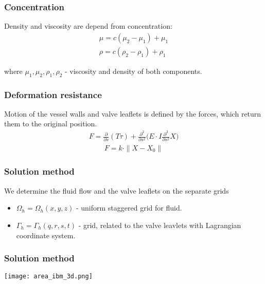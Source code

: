 \documentclass[14pt]{beamer}
\begin{document}
\begin{frame}
\frametitle{Concentration}
Density and viscosity are depend from concentration:
\begin{gather}
    \label{eq:concentration_viscosity}
    \mu = c (\mu_2 - \mu_1) + \mu_1\\
    \label{eq:concentration_density}
    \rho = c (\rho_2 - \rho_1) + \rho_1
\end{gather}

where $\mu_1, \mu_2, \rho_1, \rho_2$ - viscosity and density of both components.
\end{frame}

\begin{frame}
\frametitle{Deformation resistance}
Motion of the vessel walls and valve leaflets is defined by the forces, which return them to the original position.
\begin{gather}
    \label{eq:strain_energy}
    F =  \frac{\partial}{\partial s}(T \tau) + \frac{\partial^2}{\partial s^2} \Big( E \cdot I \frac{\partial^2}{\partial s^2} X \Big)
\end{gather}
\begin{gather}
    \label{eq:define_boundary_force}
    F = k \cdot \|X - X_0\|
\end{gather}
\end{frame}

\begin{frame}
\frametitle{Solution method}
We determine the fluid flow and the valve leaflets on the separate grids
\begin{itemize}
    \item[\MVRightarrow] $\Omega_h = \Omega_h(x, y, z)$ - uniform staggered grid for fluid.
    \item[\MVRightarrow] $\Gamma_h = \Gamma_h(q, r, s, t)$ - grid, related to the valve leavlets with Lagrangian coordinate system.
\end{itemize}

\end{frame}

\begin{frame}
\frametitle{Solution method}
    \begin{center}
        \texttt{[image: area\_ibm\_3d.png]}
    \end{center}
\end{frame}
\end{document}
